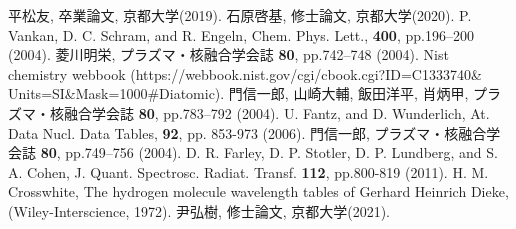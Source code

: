 \begin{thebibliography}{99}
     平松友, 卒業論文, 京都大学(2019).
     石原啓基, 修士論文, 京都大学(2020).
     P. Vankan, D. C. Schram, and R. Engeln, Chem. Phys. Lett., \textbf{400}, pp.196–200 (2004).
     菱川明栄, プラズマ・核融合学会誌 \textbf{80}, pp.742–748 (2004).
     Nist chemistry webbook (https://webbook.nist.gov/cgi/cbook.cgi?ID=C1333740\&\\Units=SI\&Mask=1000\#Diatomic).
     門信一郎, 山崎大輔, 飯田洋平, 肖炳甲, プラズマ・核融合学会誌 \textbf{80}, pp.783–792 (2004).
     U. Fantz, and D. Wunderlich, At. Data Nucl. Data Tables, \textbf{92}, pp. 853-973 (2006).
     門信一郎, プラズマ・核融合学会誌 \textbf{80}, pp.749–756 (2004).
     D. R. Farley, D. P. Stotler, D. P. Lundberg, and S. A. Cohen, J. Quant. Spectrosc. Radiat. Transf. \textbf{112}, pp.800-819 (2011).
     H. M. Crosswhite, The hydrogen molecule wavelength tables of Gerhard Heinrich Dieke, (Wiley-Interscience, 1972).
     尹弘樹, 修士論文, 京都大学(2021).
\end{thebibliography}